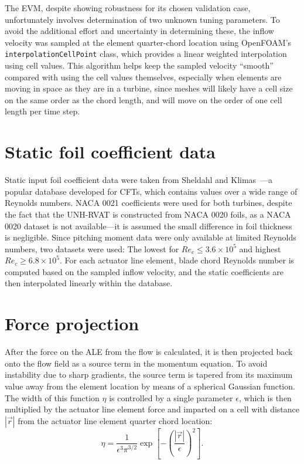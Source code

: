The EVM, despite showing robustness for its chosen validation case,
unfortunately involves determination of two unknown tuning parameters. To avoid
the additional effort and uncertainty in determining these, the inflow velocity
was sampled at the element quarter-chord location using OpenFOAM's
\texttt{interpolationCellPoint} class, which provides a linear weighted
interpolation using cell values. This algorithm helps keep the sampled velocity
``smooth'' compared with using the cell values themselves, especially when
elements are moving in space as they are in a turbine, since meshes will likely
have a cell size on the same order as the chord length, and will move on the
order of one cell length per time step.


\section{Static foil coefficient data}

Static input foil coefficient data were taken from Sheldahl and
Klimas~\cite{Sheldahl1981}---a popular database developed for CFTs, which
contains values over a wide range of Reynolds numbers. NACA 0021 coefficients
were used for both turbines, despite the fact that the UNH-RVAT is constructed
from NACA 0020 foils, as a NACA 0020 dataset is not available---it is assumed
the small difference in foil thickness is negligible. Since pitching moment data
were only available at limited Reynolds numbers, two datasets were used: The
lowest for $Re_c \leq 3.6 \times 10^5$ and highest $Re_c \geq 6.8 \times 10^5$.
For each actuator line element, blade chord Reynolds number is computed based on
the sampled inflow velocity, and the static coefficients are then interpolated
linearly within the database.


\section{Force projection}

After the force on the ALE from the flow is calculated, it is then projected
back onto the flow field as a source term in the momentum equation. To avoid
instability due to sharp gradients, the source term is tapered from its maximum
value away from the element location by means of a spherical Gaussian function.
The width of this function $\eta$ is controlled by a single parameter
$\epsilon$, which is then multiplied by the actuator line element force and
imparted on a cell with distance $| \vec{r} |$ from the actuator line element
quarter chord location:
\begin{equation}
    \eta = \frac{1}{\epsilon^3 \pi^{3/2}} \exp 
    \left[ - \left( \frac{| \vec{r} |}{\epsilon} \right)^2 \right].
    \label{eq:projection}
\end{equation}

